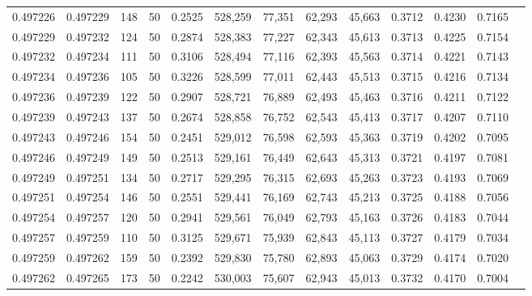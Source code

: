 \begin{tabular}{rrrrrrrrrrrrr}
0.497226 & 0.497229 &   148 &  50 &                                     0.2525 & 528,259 &  77,351 &  62,293 &  45,663 & 0.3712 & 0.4230 & 0.7165 \\
0.497229 & 0.497232 &   124 &  50 &                                     0.2874 & 528,383 &  77,227 &  62,343 &  45,613 & 0.3713 & 0.4225 & 0.7154 \\
0.497232 & 0.497234 &   111 &  50 &                                     0.3106 & 528,494 &  77,116 &  62,393 &  45,563 & 0.3714 & 0.4221 & 0.7143 \\
0.497234 & 0.497236 &   105 &  50 &                                     0.3226 & 528,599 &  77,011 &  62,443 &  45,513 & 0.3715 & 0.4216 & 0.7134 \\
0.497236 & 0.497239 &   122 &  50 &                                     0.2907 & 528,721 &  76,889 &  62,493 &  45,463 & 0.3716 & 0.4211 & 0.7122 \\
0.497239 & 0.497243 &   137 &  50 &                                     0.2674 & 528,858 &  76,752 &  62,543 &  45,413 & 0.3717 & 0.4207 & 0.7110 \\
0.497243 & 0.497246 &   154 &  50 &                                     0.2451 & 529,012 &  76,598 &  62,593 &  45,363 & 0.3719 & 0.4202 & 0.7095 \\
0.497246 & 0.497249 &   149 &  50 &                                     0.2513 & 529,161 &  76,449 &  62,643 &  45,313 & 0.3721 & 0.4197 & 0.7081 \\
0.497249 & 0.497251 &   134 &  50 &                                     0.2717 & 529,295 &  76,315 &  62,693 &  45,263 & 0.3723 & 0.4193 & 0.7069 \\
0.497251 & 0.497254 &   146 &  50 &                                     0.2551 & 529,441 &  76,169 &  62,743 &  45,213 & 0.3725 & 0.4188 & 0.7056 \\
0.497254 & 0.497257 &   120 &  50 &                                     0.2941 & 529,561 &  76,049 &  62,793 &  45,163 & 0.3726 & 0.4183 & 0.7044 \\
0.497257 & 0.497259 &   110 &  50 &                                     0.3125 & 529,671 &  75,939 &  62,843 &  45,113 & 0.3727 & 0.4179 & 0.7034 \\
0.497259 & 0.497262 &   159 &  50 &                                     0.2392 & 529,830 &  75,780 &  62,893 &  45,063 & 0.3729 & 0.4174 & 0.7020 \\
0.497262 & 0.497265 &   173 &  50 &                                     0.2242 & 530,003 &  75,607 &  62,943 &  45,013 & 0.3732 & 0.4170 & 0.7004 \\

\end{tabular}
